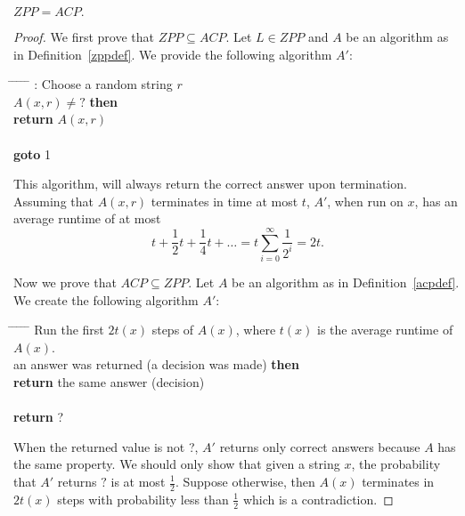 \begin{proposition}
$ZPP = ACP.$
\end{proposition}
\begin{proof}
We first prove that $ZPP \subseteq ACP$. Let $L \in ZPP$ and $A$ be an algorithm as in Definition~\ref{zppdef}. We provide the following algorithm $A'$:
\begin{tabbing}
\hspace*{.25in} \= \hspace*{.25in} \= \hspace*{.25in} \= \hspace*{.25in} \= \hspace*{.25in} \=\kill
{}: Choose a random string $r$\\
 $A(x, r) \not = ?$ {\bf then } \\
\>\> {\bf return} $A(x, r)$ \\
 \\
\>\> {\bf goto} 1\\
\end{tabbing}

This algorithm, will always return the correct answer upon termination. Assuming that $A(x, r)$ terminates in time at most $t$, $A'$, when run on $x$, has an average runtime of at most $$t + \frac{1}{2} t + \frac{1}{4} t + \ldots = t \sum_{i=0}^\infty \frac{1}{2^i} = 2t.$$

Now we prove that $ACP \subseteq ZPP$. Let $A$ be an algorithm as in Definition~\ref{acpdef}. We create the following algorithm $A'$:

\begin{tabbing}
\hspace*{.25in} \= \hspace*{.25in} \= \hspace*{.25in} \= \hspace*{.25in} \= \hspace*{.25in} \=\kill
\> Run the first $2 t(x)$ steps of $A(x)$, where $t(x)$ is the average runtime of $A(x)$. \\
 an answer was returned (a decision was made) {\bf then } \\
\>\> {\bf return} the same answer (decision) \\
 \\
\>\> {\bf return} ?\\
\end{tabbing}

When the returned value is not ?, $A'$ returns only correct answers because $A$ has the same property. We should only show that given a string $x$, the probability that $A'$ returns $?$ is at most $\frac{1}{2}$. Suppose otherwise, then $A(x)$ terminates in $2 t(x)$ steps with probability less than $\frac{1}{2}$ which is a contradiction.
\end{proof}




